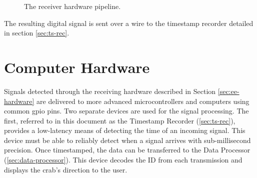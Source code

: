 \documentclass[12pt]{article}
\begin{document}
\begin{figure}[h]
\begin{center}
\end{center}
\caption{The receiver hardware pipeline.}
\label{fig:rx-detail}
\end{figure}

The resulting digital signal is sent over a wire to the timestamp
recorder detailed in section \ref{sec:ts-rec}.

\section{Computer Hardware}\label{sec:cs-hardware}

Signals detected through the receiving hardware described in
Section \ref{sec:ee-hardware} are delivered to more advanced microcontrollers
and computers using common \gls{gpio} pins.
Two separate devices are used for the signal processing.
The first,
referred to in this document as the Timestamp Recorder (\ref{sec:ts-rec}),
provides a
low-latency means of detecting the time of an incoming signal.
This device must be able to reliably detect when a signal arrives with
sub-millisecond precision.
Once timestamped, the data can be transferred to the
Data Processor (\ref{sec:data-processor}).
This device decodes the ID from each transmission and displays the crab's
direction to the user.
\end{document}
